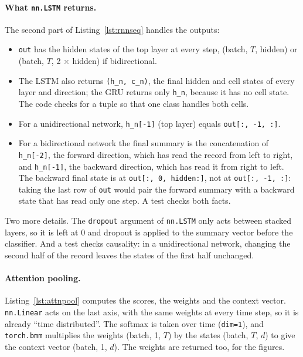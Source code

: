 

\paragraph{What \texttt{nn.LSTM} returns.} The second part of Listing~\ref{lst:rnnseq} handles the outputs:
\begin{itemize}[leftmargin=1.2em,itemsep=1pt]
  \item \texttt{out} has the hidden states of the top layer at every step, (batch, $T$, hidden) or
        (batch, $T$, 2 $\times$ hidden) if bidirectional.
  \item The LSTM also returns \texttt{(h\_n, c\_n)}, the final hidden and cell states of every layer and
        direction; the GRU returns only \texttt{h\_n}, because it has no cell state. The code checks for a
        tuple so that one class handles both cells.
  \item For a unidirectional network, \texttt{h\_n[-1]} (top layer) equals \texttt{out[:, -1, :]}.
  \item For a bidirectional network the final summary is the concatenation of \texttt{h\_n[-2]}, the
        forward direction, which has read the record from left to right, and \texttt{h\_n[-1]}, the
        backward direction, which has read it from right to left. The backward final state is at
        \texttt{out[:, 0, hidden:]}, not at \texttt{out[:, -1, :]}: taking the last row of \texttt{out}
        would pair the forward summary with a backward state that has read only one step. A test checks
        both facts.
\end{itemize}
Two more details. The \texttt{dropout} argument of \texttt{nn.LSTM} only acts between stacked layers, so it is
left at 0 and dropout is applied to the summary vector before the classifier. And a test checks causality:
in a unidirectional network, changing the second half of the record leaves the states of the first half
unchanged.

\paragraph{Attention pooling.} Listing~\ref{lst:attnpool} computes the scores, the weights and the context
vector. \texttt{nn.Linear} acts on the last axis, with the same weights at every time step, so it is already
``time distributed''. The softmax is taken over time (\texttt{dim=1}), and \texttt{torch.bmm} multiplies the
weights (batch, 1, $T$) by the states (batch, $T$, $d$) to give the context vector (batch, 1, $d$). The weights
are returned too, for the figures.

